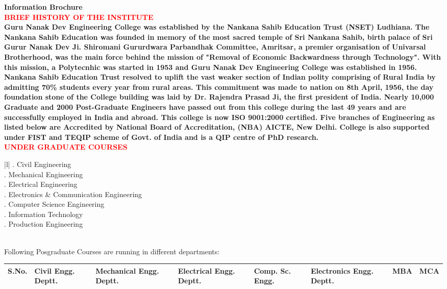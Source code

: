 \bf{Information Brochure}\\
\textcolor{red}{\large BRIEF HISTORY OF THE INSTITUTE}\\
\bf{Guru Nanak Dev Engineering College was established by the Nankana Sahib Education Trust (NSET) Ludhiana. The Nankana Sahib Education was founded in memory of the most sacred temple of Sri Nankana Sahib, birth palace of Sri Gurur Nanak Dev Ji. Shiromani Gururdwara Parbandhak Committee, Amritsar, a premier organisation of Univarsal Brotherhood, was the main force behind the mission of "Removal of Economic Backwardness through Technology". With this mission, a Polytecnhic was started in 1953 and Guru Nanak Dev Engineering College was established in 1956. Nankana Sahib Education Trust resolved to uplift the vast weaker section of Indian polity comprising of Rural India by admitting 70\% students every year from rural areas. This commitment was made to nation on 8th April, 1956, the day foundation stone of the College building was laid by Dr. Rajendra Prasad Ji, the first president of India. Nearly 10,000 Graduate and 2000 Post-Graduate Engineers have passed out from this college during the last 49 years and are successfully employed in India and abroad. This college is now ISO 9001:2000 certified. Five branches of Engineering as listed below are Accredited by National Board of Accreditation, (NBA) AICTE, New Delhi. College is also supported under FIST and TEQIP scheme of Govt. of India and is a QIP centre of PhD research.
  }\\
\textcolor{red}{\bf\large{UNDER GRADUATE COURSES}}\\
\begin{tabular}{|l|}
. Civil Engineering \\ . Mechanical Engineering\\ . Electrical Engineering\\ . Electronics & Communication Engineering\\ . Computer Science Engineering\\ . Information Technology\\ . Production Engineering\\ \hline
\end{tabular}\\
Following Posgraduate Courses are running in different departments: \\
\begin{tabular}{|p{0.25in}|p{0.4in}|p{0.4in}|p{0.6in}|p{0.6in}|p{0.6in}|p{0.25in}|p{0.25in}|}
\hline
S.No. & Civil Engg. Deptt. & Mechanical Engg. Deptt. & Electrical Engg. Deptt. & Comp. Sc. Engg. & Electronics Engg. Deptt. & MBA & MCA\\ \hline
\end{tabular}
